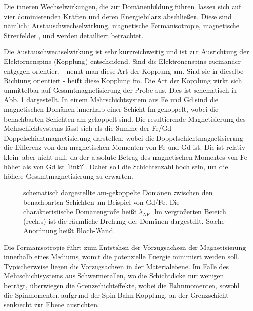 \noindent
Die inneren Wechselwirkungen, die zur Domänenbildung führen, lassen sich auf vier dominierenden Kräften und deren Energiebilanz abschließen. Diese sind nämlich: Austauschwechselwirkung, magnetische Formanisotropie, magnetische Streufelder \cite[Kap. 3.2]{hubert_magnetic_1998}, \cite{hellwig_domain_2007} und werden detailliert betrachtet.

\noindent
Die Austauschwechselwirkung ist sehr kurzreichweitig und ist zur Ausrichtung der Elektornenspins (Kopplung) entscheidend. Sind die Elektronenspins zueinander entgegen orientiert - nennt man diese Art der Kopplung \gls{am}. Sind sie in dieselbe Richtung orientiert - heißt diese Kopplung \gls{fm}. Die Art der Kopplung wirkt sich unmittelbar auf Gesamtmagnetisierung der Probe aus. Dies ist schematisch in Abb. \ref{fig:am_fm_kopplung} dargestellt. In einem Mehrschichtsystem aus Fe und Gd sind die magnetischen Domänen innerhalb einer Schicht \gls{fm} gekoppelt, wobei die benachbarten Schichten \gls{am} gekoppelt sind. Die resultierende Magnetisierung des Mehrschichtsystems lässt sich als die Summe der Fe/Gd-Doppelschichtmagnetisierung darstellen, wobei die Doppelschichtmagnetisierung die Differenz von den magnetischen Momenten von Fe und Gd ist. Die ist relativ klein, aber nicht null, da der absolute Betrag des magnetischen Momentes von Fe höher als von Gd ist [link?]. Daher soll die Schichtenzahl hoch sein, um die höhere Gesamtmagnetisierung zu erwarten.
\begin{figure}[H]
    \centering
    
    \caption{schematisch dargestellte \gls{am}-gekoppelte Domänen zwischen den benachbarten Schichten am Beispiel von Gd/Fe. Die charakteristische Domänengröße heißt $\lambda_{\text{AF}}$. Im vergrößerten Bereich (rechts) ist die räumliche Drehung der Domänen dargestellt. Solche Anordnung heißt Bloch-Wand.}
    \label{fig:am_fm_kopplung}
\end{figure}
\noindent
Die Formanisotropie führt zum Entstehen der Vorzugsachsen der Magnetisierung innerhalb eines Mediums, womit die potenzielle Energie minimiert werden soll. Typischerweise liegen die Vorzugsachsen in der Materialebene. Im Falle des Mehrschichtsystems aus Schwermetallen, wo die Schichtdicke nur wenigen  beträgt, überwiegen die Grenzschichteffekte, wobei die Bahnmomenten, sowohl die Spinmomenten aufgrund der Spin-Bahn-Kopplung, an der Grenzschicht senkrecht zur Ebene ausrichten.

